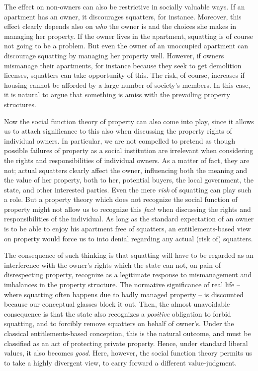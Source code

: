 The effect on non-owners can also be restrictive in socially valuable ways. If an apartment has an owner, it discourages squatters, for instance. Moreover, this effect clearly depends also on {\it who} the owner is and the choices she makes in managing her property. If the owner lives in the apartment, squatting is of course not going to be a problem. But even the owner of an unoccupied apartment can discourage squatting by managing her property well. However, if owners mismanage their apartments, for instance because they seek to get demolition licenses, squatters can take opportunity of this. The risk, of course, increases if housing cannot be afforded by a large number of society's members. In this case, it is natural to argue that something is amiss with the prevailing property structures.

Now the social function theory of property can also come into play, since it allows us to attach significance to this also when discussing the property rights of individual owners.  In particular, we are not compelled to pretend as though possible failures of property as a social institution are irrelevant when considering the rights and responsibilities of individual owners. As a matter of fact, they are not; actual squatters clearly affect the owner, influencing both the meaning and the value of her property, both to her, potential buyers, the local government, the state, and other interested parties. Even the mere {\it risk} of squatting can play such a role. But a property theory which does not recognize the social function of property might not allow us to recognize this {\it fact} when discussing the rights and responsibilities of the individual. As long as the standard expectation of an owner is to be able to enjoy his apartment free of squatters, an entitlements-based view on property would force us to into denial regarding any actual (risk of) squatters.

The consequence of such thinking is that squatting will have to be regarded as an interference with the owner's rights which the state can not, on pain of disrespecting property, recognize as a legitimate response to mismanagement and imbalances in the property structure. The normative significance of real life -- where squatting often happens due to badly managed property -- is discounted  because our conceptual glasses block it out. Then, the almost unavoidable consequence is that the state also recognizes a {\it positive} obligation to forbid squatting, and to forcibly remove squatters on behalf of owner's. Under the classical entitlements-based conception, this is the natural outcome, and must be classified as an act of protecting private property. Hence, under standard liberal values, it also becomes {\it good}. Here, however, the social function theory permits us to take a highly divergent view, to carry forward a different value-judgment.

